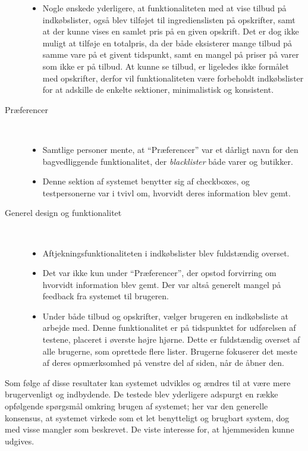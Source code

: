 \begin{description}
\begin{itemize}[nolistsep, noitemsep]
	\item Nogle ønskede yderligere, at funktionaliteten med at vise tilbud på indkøbslister, også blev tilføjet til ingredienslisten på opskrifter, samt at der kunne vises en samlet pris på en given opskrift.
	Det er dog ikke muligt at tilføje en totalpris, da der både eksisterer mange tilbud på samme vare på et givent tidspunkt, samt en mangel på priser på varer som ikke er på tilbud.
	At kunne se tilbud, er ligeledes ikke formålet med opskrifter, derfor vil funktionaliteten være forbeholdt indkøbslister for at adskille de enkelte sektioner, minimalistisk og konsistent.
	\end{itemize}
   \item[Præferencer]\hfill\\
   \vspace{-15pt}
   	\begin{itemize}[nolistsep, noitemsep]
	\item Samtlige personer mente, at ``Præferencer'' var et dårligt navn for den bagvedliggende funktionalitet, der \textit{blacklister} både varer og butikker.
	\item Denne sektion af systemet benytter sig af checkboxes, og testpersonerne var i tvivl om, hvorvidt deres information blev gemt.
	\end{itemize}
   \item[Generel design og funktionalitet]\hfill\\
   \vspace{-15pt}
	\begin{itemize}[nolistsep, noitemsep]
	\item Aftjekningsfunktionaliteten i indkøbslister blev fuldstændig overset.
	\item Det var ikke kun under ``Præferencer'', der opstod forvirring om hvorvidt information blev gemt. 
	Der var altså generelt mangel på feedback fra systemet til brugeren.
	\item Under både tilbud og opskrifter, vælger brugeren en indkøbsliste at arbejde med.
	Denne funktionalitet er på tidspunktet for udførelsen af testene, placeret i øverste højre hjørne.
	Dette er fuldstændig overset af alle brugerne, som oprettede flere lister.
	Brugerne fokuserer det meste af deres opmærksomhed på venstre del af siden, når de åbner den.
	\end{itemize}
\end{description}

Som følge af disse resultater kan systemet udvikles og ændres til at være mere brugervenligt og indbydende.
De testede blev yderligere adspurgt en række opfølgende spørgsmål omkring brugen af systemet; her var den generelle konsensus, at systemet virkede som et let benytteligt og brugbart system, dog med visse mangler som beskrevet.
De viste interesse for, at hjemmesiden kunne udgives.


